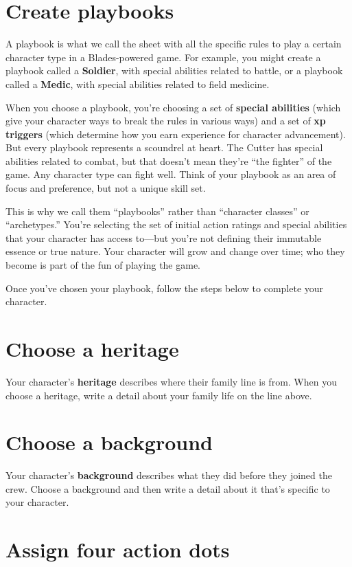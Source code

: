 \documentclass[11pt,fleqn,a5paper]{book}
\begin{document}
\section{Create playbooks}

A playbook is what we call the sheet with all the specific rules to play a certain character type in a Blades-powered game. For example, you might create a playbook called a \textbf{Soldier}, with special abilities related to battle, or a playbook called a \textbf{Medic}, with special abilities related to field medicine.

When you choose a playbook, you’re choosing a set of \textbf{special abilities} (which give your character ways to break the rules in various ways) and a set of \textbf{xp triggers} (which determine how you earn experience for character advancement). But every playbook represents a scoundrel at heart. The Cutter has special abilities related to combat, but that doesn’t mean they’re “the fighter” of the game. Any character type can fight well. Think of your playbook as an area of focus and preference, but not a unique skill set.

This is why we call them “playbooks” rather than “character classes” or “archetypes.” You’re selecting the set of initial action ratings and special abilities that your character has access to---but you’re not defining their immutable essence or true nature. Your character will grow and change over time; who they become is part of the fun of playing the game.

Once you’ve chosen your playbook, follow the steps below to complete your character.

\section{Choose a heritage}

Your character’s \textbf{heritage} describes where their family line is from. When you choose a heritage, write a detail about your family life on the line above.

\section{Choose a background}

Your character’s \textbf{background} describes what they did before they joined the crew. Choose a background and then write a detail about it that’s specific to your character.

\section{Assign four action dots}
\end{document}
